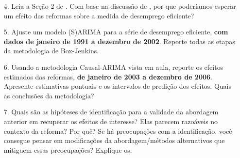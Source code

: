 \documentclass[12pt,a4paper]{article}
\begin{document}
		\begin{enumerate}
	\item[4.] Leia a Seção 2 de \citet{Bradley2019}. Com base na discussão de \citet{michaillat2022u}, por que poderíamos esperar um efeito das reformas sobre a medida de desemprego eficiente?
	
	\item[5.] Ajuste um modelo (S)ARIMA para a série de desemprego eficiente, \textbf{com dados de janeiro de 1991 a dezembro de 2002}. Reporte todas as etapas da metodologia de Box-Jenkins.
	
	\item[6.] Usando a metodologia Causal-ARIMA vista em aula, reporte os efeitos estimados das reformas, \textbf{de janeiro de 2003 a dezembro de 2006}. Apresente estimativas pontuais e os intervalos de predição dos efeitos. Quais as conclusões da metodologia?
	
	\item[7.] Quais são as hipóteses de identificação para a validade da abordagem anterior em recuperar os efeitos de interesse? Elas parecem razoáveis no contexto da reforma? Por quê? Se há preocupações com a identificação, você consegue pensar em modificações da abordagem/métodos alternativos que mitiguem essas preocupações? Explique-os.
	
	
	
\end{enumerate}
\printbibliography
\end{document}
